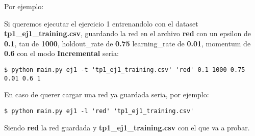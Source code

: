 Por ejemplo: 

Si queremos ejecutar el ejercicio 1 entrenandolo con el dataset \textbf{tp1\_ej1\_training.csv}, guardando la red en el archivo 
\textbf{red} con un epsilon de \textbf{0.1}, tau de \textbf{1000}, holdout\_rate de \textbf{0.75} learning\_rate de \textbf{0.01}, momentum de \textbf{0.6} con el modo \textbf{Incremental} seria:

\begin{verbatim}
$ python main.py ej1 -t 'tp1_ej1_training.csv' 'red' 0.1 1000 0.75  0.01 0.6 1 
\end{verbatim}

En caso de querer cargar una red ya guardada seria, por ejemplo:

\begin{verbatim}
$ python main.py ej1 -l 'red' 'tp1_ej1_training.csv'
\end{verbatim}

Siendo \textbf{red} la red guardada y \textbf{tp1\_ej1\_training.csv} con el que va a probar.